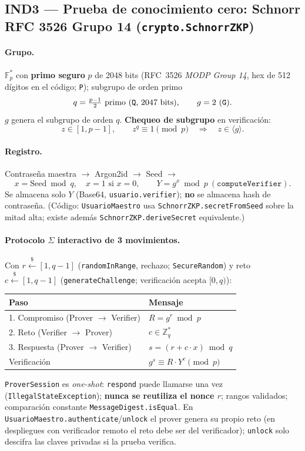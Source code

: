 \documentclass[11pt,a4paper]{article}
\newcommand{\Zq}{\mathbb{Z}_q}
\newcommand{\Fp}{\mathbb{F}_p}
\begin{document}
\subsection{IND3 --- Prueba de conocimiento cero: Schnorr RFC 3526 Grupo 14 (\texttt{crypto.SchnorrZKP})}
\paragraph{Grupo.} $\Fp^*$ con \textbf{primo seguro} $p$ de 2048 bits (RFC~3526
\emph{MODP Group 14}, hex de 512 dígitos en el código; \texttt{P}); subgrupo de
orden primo
\[
  q = \tfrac{p-1}{2}\ \text{primo (\texttt{Q}, 2047 bits)},\qquad g = 2\ (\texttt{G}).
\]
$g$ genera el subgrupo de orden $q$. \textbf{Chequeo de subgrupo} en verificación:
\[
  z \in [1, p-1],\qquad z^{q} \equiv 1 \pmod p\quad\Rightarrow\quad z \in \langle g\rangle .
\]
\paragraph{Registro.} Contraseña maestra $\to$ Argon2id $\to$ Seed $\to$
\[
  x = \text{Seed} \bmod q,\quad x{=}1 \text{ si } x{=}0,\qquad
  Y = g^{x} \bmod p\ (\texttt{computeVerifier}).
\]
Se almacena solo $Y$ (Base64, \texttt{usuario.verifier}); \textbf{no} se almacena
hash de contraseña. (Código: \texttt{UsuarioMaestro} usa
\texttt{SchnorrZKP.secretFromSeed} sobre la mitad alta; existe además
\texttt{SchnorrZKP.deriveSecret} equivalente.)
\paragraph{Protocolo $\Sigma$ interactivo de 3 movimientos.} Con $r \xleftarrow{\$} [1, q-1]$
(\texttt{randomInRange}, rechazo; \texttt{SecureRandom}) y reto $c \xleftarrow{\$} [1, q-1]$
(\texttt{generateChallenge}; verificación acepta $[0,q)$):
\begin{center}
\begin{tabular}{@{}ll@{}}
\toprule
Paso & Mensaje \\
\midrule
1. Compromiso (Prover $\to$ Verifier) & $R = g^{r} \bmod p$ \\
2. Reto (Verifier $\to$ Prover) & $c \in \Zq^*$ \\
3. Respuesta (Prover $\to$ Verifier) & $s = (r + c\cdot x) \bmod q$ \\
\midrule
Verificación & $g^{s} \equiv R \cdot Y^{c} \pmod p$ \\
\bottomrule
\end{tabular}
\end{center}
\texttt{ProverSession} es \emph{one-shot}: \texttt{respond} puede llamarse una vez
(\texttt{IllegalStateException}); \textbf{nunca se reutiliza el nonce $r$}; rangos
validados; comparación constante \texttt{MessageDigest.isEqual}. En
\texttt{UsuarioMaestro.authenticate}/\texttt{unlock} el prover genera su propio
reto (en despliegues con verificador remoto el reto debe ser del verificador);
\texttt{unlock} solo descifra las claves privadas si la prueba verifica.
\end{document}
